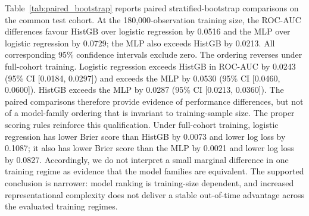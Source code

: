 \documentclass[10pt]{article}
\begin{document}
Table~\ref{tab:paired_bootstrap} reports paired stratified-bootstrap comparisons on the common test cohort. At the 180,000-observation training size, the ROC-AUC differences favour HistGB over logistic regression by 0.0516 and the MLP over logistic regression by 0.0729; the MLP also exceeds HistGB by 0.0213. All corresponding 95\% confidence intervals exclude zero. The ordering reverses under full-cohort training. Logistic regression exceeds HistGB in ROC-AUC by 0.0243 (95\% CI [0.0184, 0.0297]) and exceeds the MLP by 0.0530 (95\% CI [0.0460, 0.0600]). HistGB exceeds the MLP by 0.0287 (95\% CI [0.0213, 0.0360]). The paired comparisons therefore provide evidence of performance differences, but not of a model-family ordering that is invariant to training-sample size. The proper scoring rules reinforce this qualification. Under full-cohort training, logistic regression has lower Brier score than HistGB by 0.0073 and lower log loss by 0.1087; it also has lower Brier score than the MLP by 0.0021 and lower log loss by 0.0827. Accordingly, we do not interpret a small marginal difference in one training regime as evidence that the model families are equivalent. The supported conclusion is narrower: model ranking is training-size dependent, and increased representational complexity does not deliver a stable out-of-time advantage across the evaluated training regimes.
\end{document}
